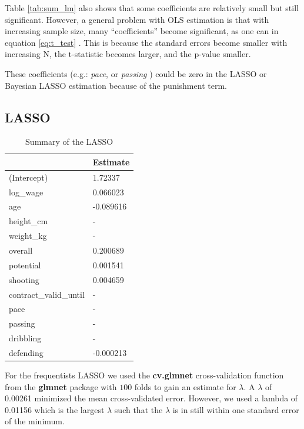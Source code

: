 \documentclass[12pt,a4paper]{article}
\begin{document}
Table \ref{tab:sum_lm} also shows that some coefficients are relatively
small but still significant. However, a general problem with \ac{OLS}
estimation is that with increasing sample size, many
\enquote{coefficients} become significant, as one can in equation
\ref{eq:t_test} . This is because the standard errors become smaller
with increasing N, the t-statistic becomes larger, and the p-value
smaller. \autocite{royall_effect_1986}

These coefficients (e.g.: \emph{pace}, or \emph{passing} ) could be zero
in the \ac{LASSO} or Bayesian \ac{LASSO} estimation because of the
punishment term.

\hypertarget{section-1}{%
\subsection{\texorpdfstring{\acf{LASSO}}{}}\label{section-1}}

\begin{table}[!h]

\caption{\label{tab:unnamed-chunk-3}\label{tab:sum_lasso} Summary of the LASSO }
\centering
\begin{tabular}[t]{ll}
\toprule
  & Estimate\\
\midrule
\rowcolor{gray!6}  (Intercept) & 1.72337\\
log\_wage & 0.066023\\
\rowcolor{gray!6}  age & -0.089616\\
height\_cm & -\\
\rowcolor{gray!6}  weight\_kg & -\\
overall & 0.200689\\
\rowcolor{gray!6}  potential & 0.001541\\
shooting & 0.004659\\
\rowcolor{gray!6}  contract\_valid\_until & -\\
pace & -\\
\rowcolor{gray!6}  passing & -\\
dribbling & -\\
\rowcolor{gray!6}  defending & -0.000213\\
\bottomrule
\end{tabular}
\end{table}

For the frequentists \ac{LASSO} we used the \textbf{cv.glmnet}
cross-validation function from the \textbf{glmnet} package with \(100\)
folds to gain an estimate for \(\lambda\). A \(\lambda\) of 0.00261
minimized the mean cross-validated error. However, we used a lambda of
0.01156 which is the largest \(\lambda\) such that the \(\lambda\) is in
still within one standard error of the minimum.
\textcite{hastle_glmnet_2019}
\end{document}
